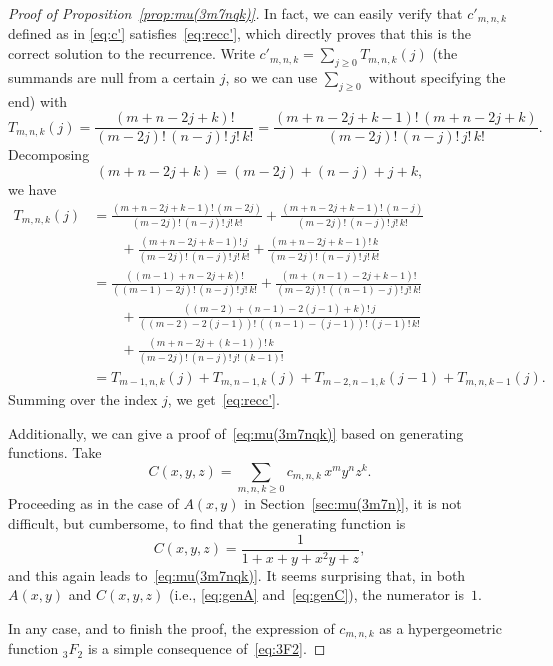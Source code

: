 \documentclass[11pt, a4paper]{article}
\theoremstyle{plain}
\theoremstyle{definition}
\begin{document}
\begin{proof}[Proof of Proposition~\ref{prop:mu(3m7nqk)}]
In fact, we can easily verify that $c'_{m,n,k}$ defined as in \eqref{eq:c'} satisfies~\eqref{eq:recc'}, which directly proves that this is the correct solution to the recurrence. 
Write $c'_{m,n,k} = \sum_{j \ge 0} T_{m,n,k}(j)$ (the summands are null from a certain $j$, so we can use $\sum_{j \ge 0}$ without specifying the end) with
\begin{equation*}
  T_{m,n,k}(j) = \frac{(m+n - 2j + k)!}{(m - 2j)!\,(n - j)!\,j!\,k!}
  = \frac{(m+n - 2j + k-1)!\,(m+n - 2j + k)}{(m - 2j)!\,(n - j)!\,j!\,k!}.
\end{equation*}
Decomposing
\begin{equation*}
  (m+n - 2j + k) = (m - 2j) + (n - j) + j + k,
\end{equation*}
we have 
\begin{align*}
  T_{m,n,k}(j)
  &= \frac{(m+n - 2j + k-1)!\,(m - 2j)}{(m - 2j)!\,(n - j)!\,j!\,k!}
  + \frac{(m+n - 2j + k-1)!\,(n - j)}{(m - 2j)!\,(n - j)!\,j!\,k!} \\
  &\qquad + \frac{(m+n - 2j + k-1)!\,j}{(m - 2j)!\,(n - j)!\,j!\,k!} 
  + \frac{(m+n - 2j + k-1)!\,k}{(m - 2j)!\,(n - j)!\,j!\,k!} \\
  &= \frac{((m-1)+n - 2j + k)!}{((m-1) - 2j)!\,(n - j)!\,j!\,k!}
  + \frac{(m+(n-1) - 2j + k-1)!}{(m - 2j)!\,((n-1) - j)!\,j!\,k!} \\
  &\qquad + \frac{((m-2)+(n-1) - 2(j-1) + k)!\,j}{((m-2) - 2(j-1))!\,((n-1) - (j-1))!\,(j-1)!\,k!} \\
  &\qquad + \frac{(m+n - 2j + (k-1))!\,k}{(m - 2j)!\,(n - j)!\,j!\,(k-1)!} \\
  &= T_{m-1,n,k}(j) + T_{m,n-1,k}(j) + T_{m-2,n-1,k}(j-1) + T_{m,n,k-1}(j).
\end{align*}
Summing over the index $j$, we get~\eqref{eq:recc'}.

Additionally, we can give a proof of~\eqref{eq:mu(3m7nqk)} based on generating functions. Take
\begin{equation*}
  C(x,y,z) = \sum_{m,n,k\ge0} c_{m,n,k}\,x^m y^n z^k.
\end{equation*}
Proceeding as in the case of $A(x,y)$ in Section~\ref{sec:mu(3m7n)}, 
it is not difficult, but cumbersome, to find that the generating function is
\begin{equation}
\label{eq:genC}
  C(x,y,z) = \frac{1}{1 + x + y + x^2 y + z},
\end{equation}
and this again leads to~\eqref{eq:mu(3m7nqk)}.
It seems surprising that, in both $A(x,y)$ and $C(x,y,z)$ (i.e., \eqref{eq:genA} and~\eqref{eq:genC}), the numerator is~$1$.

In any case, and to finish the proof, the expression of $c_{m,n,k}$ as a hypergeometric function ${}_3F_2$ is a simple consequence of~\eqref{eq:3F2}.
\end{proof}
\end{document}
